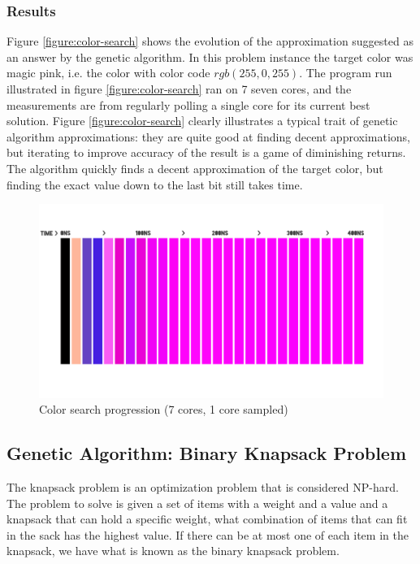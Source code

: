 \subsubsection{Results}

Figure \vref{figure:color-search} shows the evolution of the approximation suggested as an answer by the genetic algorithm.
In this problem instance the target color was magic pink, i.e. the color with color code $ rgb(255, 0, 255) $.
The program run illustrated in figure \vref{figure:color-search} ran on 7 seven cores, and the measurements are from regularly polling a single core for its current best solution.
Figure \vref{figure:color-search} clearly illustrates a typical trait of genetic algorithm approximations: they are quite good at finding decent approximations, but iterating to improve accuracy of the result is a game of diminishing returns.
The algorithm quickly finds a decent approximation of the target color, but finding the exact value down to the last bit still takes time.

\begin{figure}[H]
    \begin{center}
        \includegraphics[width=\textwidth]{fig/color-search}
    \caption{Color search progression (7 cores, 1 core sampled)}
    \label{figure:color-search}
    \end{center}
\end{figure}

\subsection{Genetic Algorithm: Binary Knapsack Problem}

The knapsack problem is an optimization problem that is considered NP-hard.
The problem to solve is given a set of items with a weight and a value and a knapsack that can hold a specific weight, what combination of items that can fit in the sack has the highest value.
If there can be at most one of each item in the knapsack, we have what is known as the binary knapsack problem.

